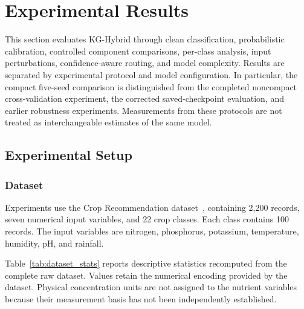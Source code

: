 
\section{Experimental Results}
\label{sec:experimental_results}

This section evaluates KG-Hybrid through clean classification,
probabilistic calibration, controlled component comparisons, per-class
analysis, input perturbations, confidence-aware routing, and model
complexity. Results are separated by experimental protocol and model
configuration. In particular, the compact five-seed comparison is
distinguished from the completed noncompact cross-validation experiment,
the corrected saved-checkpoint evaluation, and earlier robustness
experiments. Measurements from these protocols are not treated as
interchangeable estimates of the same model.

\subsection{Experimental Setup}

\subsubsection{Dataset}

Experiments use the Crop Recommendation
dataset~\cite{cropdataset}, containing 2,200 records, seven numerical
input variables, and 22 crop classes. Each class contains 100 records.
The input variables are nitrogen, phosphorus, potassium, temperature,
humidity, pH, and rainfall.

Table~\ref{tab:dataset_stats} reports descriptive statistics recomputed
from the complete raw dataset. Values retain the numerical encoding
provided by the dataset. Physical concentration units are not assigned
to the nutrient variables because their measurement basis has not been
independently established.

